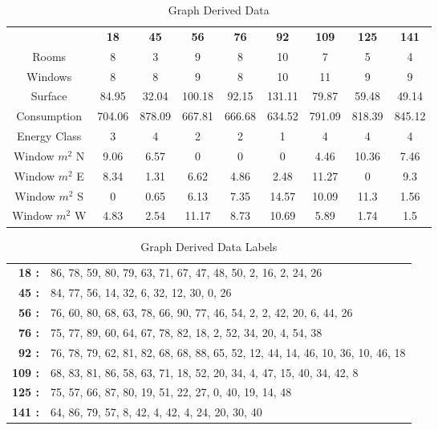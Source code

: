 \documentclass[a4paper, 12pt]{report}
\begin{document}
\begin{table}
\centering
\begin{tabular}{ ccccccccc }
& \textbf{18} & \textbf{45} & \textbf{56} & \textbf{76} & \textbf{92} & \textbf{109} & \textbf{125} & \textbf{141} \\
Rooms & 8 & 3 & 9 & 8 & 10 & 7 & 5 & 4 \\
Windows & 8 & 8 & 9 & 8 & 10 & 11 & 9 & 9 \\
Surface & 84.95 & 32.04 & 100.18 & 92.15 & 131.11 & 79.87 & 59.48 & 49.14 \\
Consumption & 704.06 & 878.09 & 667.81 & 666.68 & 634.52 & 791.09 & 818.39 & 845.12 \\
Energy Class & 3 & 4 & 2 & 2 & 1 & 4 & 4 & 4 \\
Window $m^2$ N & 9.06 & 6.57 & 0 & 0 & 0 & 4.46 & 10.36 & 7.46 \\
Window $m^2$ E & 8.34 & 1.31 & 6.62 & 4.86 & 2.48 & 11.27 & 0 & 9.3 \\
Window $m^2$ S & 0 & 0.65 & 6.13 & 7.35 & 14.57 & 10.09 & 11.3 & 1.56 \\
Window $m^2$ W & 4.83 & 2.54 & 11.17 & 8.73 & 10.69 & 5.89 & 1.74 & 1.5 \\
\end{tabular}
\caption{Graph Derived Data}
\label{tab:graph-derived-data}
\end{table}

\begin{table}
\centering
\begin{tabular}{ r l }
\textbf{18 :} & 86, 78, 59, 80, 79, 63, 71, 67, 47, 48, 50, 2, 16, 2, 24, 26 \\
\textbf{45 :} & 84, 77, 56, 14, 32, 6, 32, 12, 30, 0, 26 \\
\textbf{56 :} & 76, 60, 80, 68, 63, 78, 66, 90, 77, 46, 54, 2, 2, 42, 20, 6, 44, 26 \\
\textbf{76 :} & 75, 77, 89, 60, 64, 67, 78, 82, 18, 2, 52, 34, 20, 4, 54, 38 \\
\textbf{92 :} & 76, 78, 79, 62, 81, 82, 68, 68, 88, 65, 52, 12, 44, 14, 46, 10, 36, 10, 46, 18 \\
\textbf{109 :} & 68, 83, 81, 86, 58, 63, 71, 18, 52, 20, 34, 4, 47, 15, 40, 34, 42, 8 \\
\textbf{125 :} & 75, 57, 66, 87, 80, 19, 51, 22, 27, 0, 40, 19, 14, 48 \\
\textbf{141 :} & 64, 86, 79, 57, 8, 42, 4, 42, 4, 24, 20, 30, 40 \\
\end{tabular}
\caption{Graph Derived Data Labels}
\label{tab:graph-derived-data-labels}
\end{table}
\end{document}
